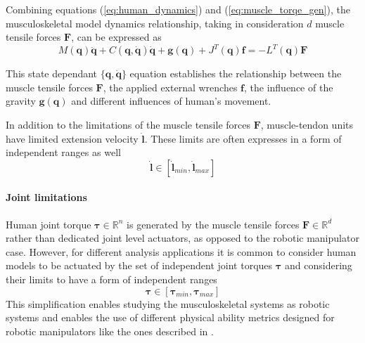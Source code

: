Combining equations (\ref{eq:human_dynamics}) and (\ref{eq:muscle_torqe_gen}), the musculoskeletal model dynamics relationship, taking in consideration $d$ muscle tensile forces $\bm{F}$, can be expressed as
\begin{equation}
    M(\bm{q})\ddot{\bm{q}} + C(\bm{q},\dot{\bm{q}})\dot{\bm{q}} + \bm{g}(\bm{q}) + J^{T}(\bm{q})\bm{f}  = -L^{T}(\bm{q})\bm{F} 
    \label{eq:human_dyn_all}
\end{equation}

This state dependant $\{\bm{q},\dot{\bm{q}}\}$ equation establishes the relationship between the muscle tensile forces $\bm{F}$, the applied external wrenches $\bm{f}$, the influence of the gravity $\bm{g}(\bm{q})$ and different influences of human's movement. 


In addition to the limitations of the muscle tensile forces $\bm{F}$, muscle-tendon units have limited extension velocity $\dot{\bm{l}}$. These limits are often expresses in a form of independent ranges as well
\begin{equation}
    \dot{\bm{l}} \in  [\dot{\bm{l}}_{min}, \dot{\bm{l}}_{max} ]
    \label{eq:human_vel_lim}
\end{equation}

\paragraph{Joint limitations} Human joint torque $\bm{\tau}\in\mathbb{R}^n$ is generated by the muscle tensile forces $\bm{F}\in \mathbb{R}^d$ rather than dedicated joint level actuators, as opposed to the robotic manipulator case. However, for different analysis applications it is common to consider human models to be actuated by the set of independent joint torques $\bm{\tau}$ and considering their limits to have a form of independent ranges \cite{HOLZBAUR20072442}
\begin{equation}
    \bm{\tau} \in [\bm{\tau}_{min},\bm{\tau}_{max}]
    \label{eq:human_torque_lim}
\end{equation}
This simplification enables studying the musculoskeletal systems as robotic systems and enables the use of different physical ability metrics designed for robotic manipulators like the ones described in . 

